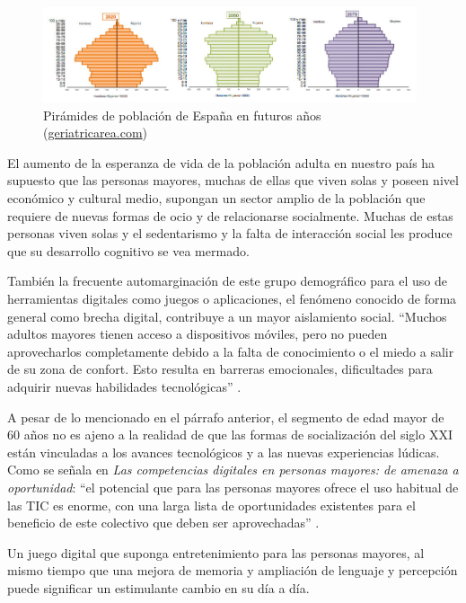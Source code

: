 \begin{figure}[ht]
    \centering
    \includegraphics[width=0.98\textwidth]{imgs/piramide-poblacion.jpg}
    \caption{Pirámides de población de España en futuros años (\href{https://www.geriatricarea.com/2020/09/25/uno-de-cada-tres-espanoles-tendra-65-o-mas-anos-en-el-2050/}{geriatricarea.com})}
    \label{fig:piramide-poblacion}
\end{figure}

El aumento de la esperanza de vida de la población adulta en nuestro país ha supuesto que las personas mayores, muchas de ellas que viven solas y poseen nivel económico y cultural medio, supongan un sector amplio de la población que requiere de nuevas formas de ocio y de relacionarse socialmente. Muchas de estas personas viven solas y el sedentarismo y la falta de interacción social les produce que su desarrollo cognitivo se vea mermado.

También la frecuente automarginación de este grupo demográfico para el uso de herramientas digitales como juegos o aplicaciones, el fenómeno conocido de forma general como brecha digital, contribuye a un mayor aislamiento social. \enquote{Muchos adultos mayores tienen acceso a dispositivos móviles, pero no pueden aprovecharlos completamente debido a la falta de conocimiento o el miedo a salir de su zona de confort. Esto resulta en barreras emocionales, dificultades para adquirir nuevas habilidades tecnológicas} \parencite{intro1}. 

A pesar de lo mencionado en el párrafo anterior, el segmento de edad mayor de 60 años no es ajeno a la realidad de que las formas de socialización del siglo XXI están vinculadas a los avances tecnológicos y a las nuevas experiencias lúdicas. Como se señala en \textit{Las competencias digitales en personas mayores: de amenaza a oportunidad}: \enquote{el potencial que para las personas mayores ofrece el uso habitual de las TIC es enorme, con una larga lista de oportunidades existentes para el beneficio de este colectivo que deben ser aprovechadas} \parencite{intro4}.

Un juego digital que suponga entretenimiento para las personas mayores, al mismo tiempo que una mejora de memoria y ampliación de lenguaje y percepción puede significar un estimulante cambio en su día a día. 


